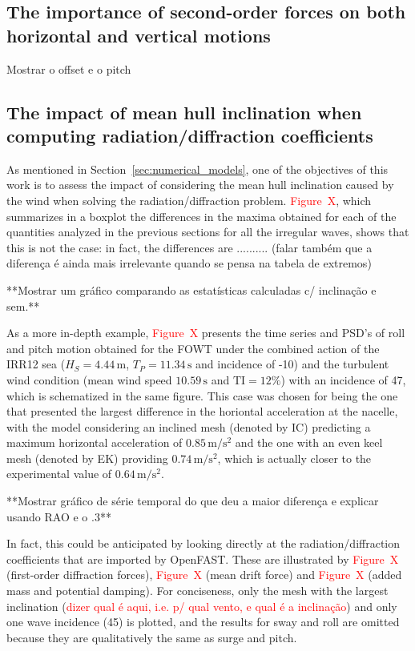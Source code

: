 \subsection{The importance of second-order forces on both horizontal and vertical motions} \label{subsec:exp_vs_num:2nd_order}
Mostrar o offset e o pitch

\subsection{The impact of mean hull inclination when computing  radiation/diffraction coefficients} \label{subsec:exp_vs_num:impact_inclination}
As mentioned in Section~\ref{sec:numerical_models}, one of the objectives of this work is to assess the impact of considering the mean hull inclination caused by the wind when solving the radiation/diffraction problem. \textcolor{red}{Figure~X}, which summarizes in a boxplot the differences in the maxima obtained for each of the quantities analyzed in the previous sections for all the irregular waves, shows that this is not the case: in fact, the differences are .......... (falar também que a diferença é ainda mais irrelevante quando se pensa na tabela de extremos)

**Mostrar um gráfico comparando as estatísticas calculadas c/ inclinação e sem.**

As a more in-depth example, \textcolor{red}{Figure~X} presents the time series and PSD's of roll and pitch motion obtained for the FOWT under the combined action of the IRR12 sea ($H_S=4.44\,\text{m}$, $T_P = 11.34\,\text{s}$ and incidence of -10\textdegree{}) and the turbulent wind condition (mean wind speed $10.59\,\text{s}$ and $\textrm{TI}=12\%$) with an incidence of 47\textdegree{}, which is schematized in the same figure. This case was chosen for being the one that presented the largest difference in the horiontal acceleration at the nacelle, with the model considering an inclined mesh (denoted by IC) predicting a maximum horizontal acceleration of $0.85\,\text{m}/\text{s}^2$ and the one with an even keel mesh (denoted by EK) providing $0.74\,\text{m}/\text{s}^2$, which is actually closer to the experimental value of $0.64\,\text{m}/\text{s}^2$. 

**Mostrar gráfico de série temporal do que deu a maior diferença e explicar usando RAO e o .3**

In fact, this could be anticipated by looking directly at the radiation/diffraction coefficients that are imported by OpenFAST. These are illustrated by \textcolor{red}{Figure~X} (first-order diffraction forces), \textcolor{red}{Figure~X} (mean drift force) and \textcolor{red}{Figure~X} (added mass and potential damping). For conciseness, only the mesh with the largest inclination (\textcolor{red}{dizer qual é aqui, i.e. p/ qual vento, e qual é a inclinação}) and only one wave incidence (45\textdegree{}) is plotted, and the results for sway and roll are omitted because they are qualitatively the same as surge and pitch.

